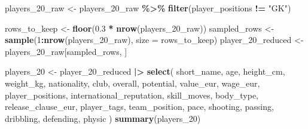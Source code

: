 \documentclass[
]{article}
\newenvironment{Shaded}{\begin{snugshade}}{\end{snugshade}}
\newcommand{\AttributeTok}[1]{\textcolor[rgb]{0.13,0.29,0.53}{#1}}
\newcommand{\DecValTok}[1]{\textcolor[rgb]{0.00,0.00,0.81}{#1}}
\newcommand{\FloatTok}[1]{\textcolor[rgb]{0.00,0.00,0.81}{#1}}
\newcommand{\FunctionTok}[1]{\textcolor[rgb]{0.13,0.29,0.53}{\textbf{#1}}}
\newcommand{\NormalTok}[1]{#1}
\newcommand{\OtherTok}[1]{\textcolor[rgb]{0.56,0.35,0.01}{#1}}
\newcommand{\SpecialCharTok}[1]{\textcolor[rgb]{0.81,0.36,0.00}{\textbf{#1}}}
\newcommand{\StringTok}[1]{\textcolor[rgb]{0.31,0.60,0.02}{#1}}
\begin{document}
\begin{Shaded}
\begin{Highlighting}[]
\NormalTok{players\_20\_raw }\OtherTok{\textless{}{-}}\NormalTok{ players\_20\_raw }\SpecialCharTok{\%\textgreater{}\%} \FunctionTok{filter}\NormalTok{(player\_positions }\SpecialCharTok{!=} \StringTok{"GK"}\NormalTok{)}

\NormalTok{rows\_to\_keep }\OtherTok{\textless{}{-}} \FunctionTok{floor}\NormalTok{(}\FloatTok{0.3} \SpecialCharTok{*} \FunctionTok{nrow}\NormalTok{(players\_20\_raw))}
\NormalTok{sampled\_rows }\OtherTok{\textless{}{-}} \FunctionTok{sample}\NormalTok{(}\DecValTok{1}\SpecialCharTok{:}\FunctionTok{nrow}\NormalTok{(players\_20\_raw), }\AttributeTok{size =}\NormalTok{ rows\_to\_keep)}
\NormalTok{player\_20\_reduced }\OtherTok{\textless{}{-}}\NormalTok{ players\_20\_raw[sampled\_rows, ]}


\NormalTok{players\_20 }\OtherTok{\textless{}{-}}\NormalTok{ player\_20\_reduced }\SpecialCharTok{|\textgreater{}} \FunctionTok{select}\NormalTok{(}
\NormalTok{  short\_name,}
\NormalTok{  age,}
\NormalTok{  height\_cm,}
\NormalTok{  weight\_kg, }
\NormalTok{  nationality,}
\NormalTok{  club,}
\NormalTok{  overall,}
\NormalTok{  potential,}
\NormalTok{  value\_eur,}
\NormalTok{  wage\_eur,}
\NormalTok{  player\_positions,}
\NormalTok{  international\_reputation,}
\NormalTok{  skill\_moves,}
\NormalTok{  body\_type,}
\NormalTok{  release\_clause\_eur,}
\NormalTok{  player\_tags,}
\NormalTok{  team\_position,}
\NormalTok{  pace,}
\NormalTok{  shooting,}
\NormalTok{  passing,}
\NormalTok{  dribbling,}
\NormalTok{  defending,}
\NormalTok{  physic}
\NormalTok{)}
\FunctionTok{summary}\NormalTok{(players\_20)}
\end{Highlighting}
\end{Shaded}
\end{document}
